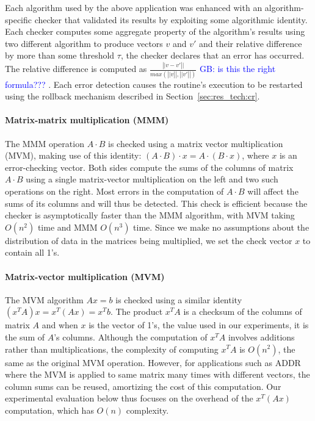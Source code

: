 \documentclass{sig-alternate}
\newcommand{\greg}[1]{%
  \textcolor{blue}{GB: #1}
}
\begin{document}
Each algorithm used by the above application was enhanced with an algorithm-specific checker that validated its results by exploiting some algorithmic identity.
Each checker computes some aggregate property of the algorithm's results using two different algorithm to produce vectors $v$ and $v'$ and their relative difference by more than some threshold $\tau$, the checker declares that an error has occurred.
The relative difference is computed as $\frac{\left|| v-v' \right||}{max(\left||v\right||, \left||v'\right||)}$ \greg{is this the right formula???}.
Each error detection causes the routine's execution to be restarted using the rollback mechanism described in Section~\ref{sec:res_tech:cr}.

\paragraph{Matrix-matrix multiplication (MMM)}
The MMM operation $A \cdot B$ is checked using a matrix vector multiplication (MVM), making use of this identity: $(A \cdot B) \cdot x = A \cdot (B \cdot x)$, where $x$ is an error-checking vector.
Both sides compute the sums of the columns of matrix $A \cdot B$ using a single matrix-vector multiplication on the left and two such operations on the right.
Most errors in the computation of $A \cdot B$ will affect the sums of its columns and will thus be detected.
This check is efficient because the checker is asymptotically faster than the MMM algorithm, with MVM taking $O(n^2)$ time and MMM $O(n^3)$ time.
Since we make no assumptions about the distribution of data in the matrices being multiplied, we set the check vector $x$ to contain all 1's.

\paragraph{Matrix-vector multiplication (MVM)}
The MVM algorithm $Ax=b$ is checked using a similar identity $(x^TA)x = x^T(Ax) = x^Tb$.
The product $x^TA$ is a checksum of the columns of matrix $A$ and when $x$ is the vector of 1's, the value used in our experiments, it is the sum of $A$'s columns.
Although the computation of $x^TA$ involves additions rather than multiplications, the complexity of computing $x^TA$ is $O(n^2)$, the same as the original MVM operation.
However, for applications such as ADDR where the MVM is applied to same matrix many times with different vectors, the column sums can be reused, amortizing the cost of this computation.
Our experimental evaluation below thus focuses on the overhead of the $x^T(Ax)$ computation, which has $O(n)$ complexity.
\end{document}
